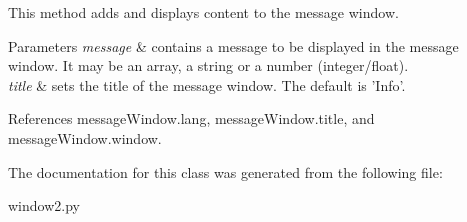 \-This method adds and displays content to the message window. 


\begin{DoxyParams}{\-Parameters}
{\em message} & contains a message to be displayed in the message window. \-It may be an array, a string or a number (integer/float). \\
\hline
{\em title} & sets the title of the message window. \-The default is '\-Info'. \\
\hline
\end{DoxyParams}


\-References message\-Window.\-lang, message\-Window.\-title, and message\-Window.\-window.



\-The documentation for this class was generated from the following file\-:\begin{DoxyCompactItemize}
\item 
window2.\-py\end{DoxyCompactItemize}
